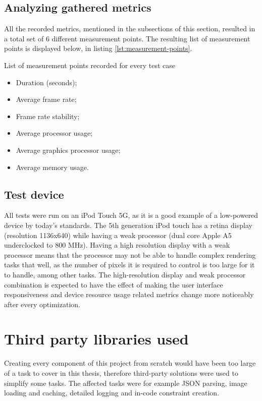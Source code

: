 \documentclass[a4paper,12pt]{article}
\begin{document}
\subsection{Analyzing gathered metrics}
All the recorded metrics, mentioned in the subsections of this section, resulted in a total set of 6 different measurement points. The resulting list of measurement points is displayed below, in listing \autoref{lst:measurement-points}.

\begin{listing}[H]
  \caption{List of measurement points recorded for every test case}
  \label{lst:measurement-points}
  \begin{itemize}
    \item Duration (seconds);
    \item Average frame rate;
    \item Frame rate stability;
    \item Average processor usage;
    \item Average graphics processor usage;
    \item Average memory usage.
  \end{itemize}
\end{listing}

\subsection{Test device}
All tests were run on an iPod Touch 5G, as it is a good example of a low-powered device by today's standards. The 5th generation iPod touch has a retina display (resolution 1136x640)\cite{AppleIPodTouch5G} while having a weak \cite{IPhoneVsIPod5} processor (dual core Apple A5 underclocked to 800 MHz)\cite{MacObserverUnderclock}. Having a high resolution display with a weak processor means that the processor may not be able to handle complex rendering tasks that well, as the number of pixels it is required to control is too large for it to handle, among other tasks.\cite{RetinaAndWeakProcessor} The high-resolution display and weak processor combination is expected to have the effect of making the user interface responsiveness and device resource usage related metrics change more noticeably after every optimization.

\section{Third party libraries used}
Creating every component of this project from scratch would have been too large of a task to cover in this thesis, therefore third-party solutions were used to simplify some tasks. The affected tasks were for example JSON parsing, image loading and caching, detailed logging and in-code constraint creation.
\end{document}

